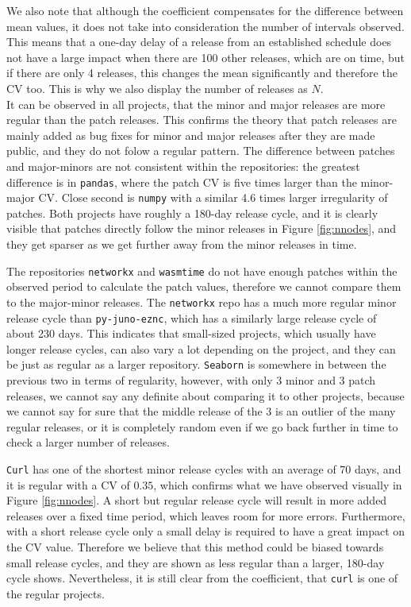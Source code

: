 We also note that although the coefficient compensates for the difference between mean values, it does not take into consideration the number of intervals observed. This means that a one-day delay of a release from an established schedule does not have a large impact when there are 100 other releases, which are on time, but if there are only 4 releases, this changes the mean significantly and therefore the CV too. This is why we also display the number of releases as $N$. \\

It can be observed in all projects, that the minor and major releases are more regular than the patch releases. This confirms the theory that patch releases are mainly added as bug fixes for minor and major releases after they are made public, and they do not folow a regular pattern. The difference between patches and major-minors are not consistent within the repositories: the greatest difference is in \texttt{pandas}, where the patch CV is five times larger than the minor-major CV. Close second is \texttt{numpy} with a similar 4.6 times larger irregularity of patches. Both projects have roughly a 180-day release cycle, and it is clearly visible that patches directly follow the minor releases in Figure \ref{fig:nnodes}, and they get sparser as we get further away from the minor releases in time.

The repositories \texttt{networkx} and \texttt{wasmtime} do not have enough patches within the observed period to calculate the patch values, therefore we cannot compare them to the major-minor releases. The \texttt{networkx} repo has a much more regular minor release cycle than \texttt{py-juno-eznc}, which has a similarly large release cycle of about 230 days. This indicates that small-sized projects, which usually have longer release cycles, can also vary a lot depending on the project, and they can be just as regular as a larger repository. \texttt{Seaborn} is somewhere in between the previous two in terms of regularity, however, with only 3 minor and 3 patch releases, we cannot say any definite about comparing it to other projects, because we cannot say for sure that the middle release of the 3 is an outlier of the many regular releases, or it is completely random even if we go back further in time to check a larger number of releases.

\texttt{Curl} has one of the shortest minor release cycles with an average of 70 days, and it is regular with a CV of $0.35$, which confirms what we have observed visually in Figure \ref{fig:nnodes}. A short but regular release cycle will result in more added releases over a fixed time period, which leaves room for more errors. Furthermore, with a short release cycle only a small delay is required to have a great impact on the CV value. Therefore we believe that this method could be biased towards small release cycles, and they are shown as less regular than a larger, 180-day cycle shows. Nevertheless, it is still clear from the coefficient, that \texttt{curl} is one of the regular projects.

